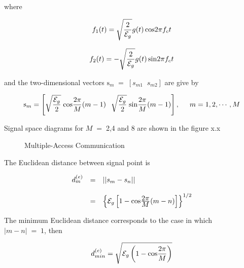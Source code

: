 where

\begin{equation}
f_1(t)=\sqrt{\frac{\hbox{$2$}}{\hbox{$\mathcal{E}_g$}}}g(t)\,\mathrm{cos}2\pi f_c t
\end{equation}

\begin{equation}
f_2(t)=-\sqrt{\frac{\hbox{$2$}}{\hbox{$\mathcal{E}_g$}}}g(t)\,\mathrm{sin}2\pi f_c t
\end{equation}

and the two-dimensional vectors $\mathrm{s}_m\;=\;[s_{m1}\;\;s_{m2}]$ are give by

\begin{equation}
\mathrm{s}_m=\left [
\sqrt{\frac{\hbox{$\mathcal{E}_g$}}{\hbox{$2$}}}\;\mathrm{cos}
\frac{\hbox{$2\pi$}}{\hbox{$M$}}(m-1)\hspace{2.5mm}
\sqrt{\frac{\hbox{$\mathcal{E}_g$}}{\hbox{$2$}}}\;\mathrm{sin}
\frac{\hbox{$2\pi$}}{\hbox{$M$}}(m-1)
\right ],\hspace{5mm} m=1,2,\cdots,M
\end{equation}

Signal space diagrams for $M\;=\;$2,4 and 8 are shown in the figure x.x \\

\begin{figure}[htb]
\centerline{  }
\caption{Multiple-Access Communication}
\end{figure}

The Euclidean distance between signal point is 

\begin{eqnarray}
\begin{array}{lll}
d_m^{(e)}&=&\vert \vert s_m - s_n \vert \vert \\ \\
&=&\left \{\mathcal{E}_g\left [1-\mathrm{cos}\frac{\hbox{$2\pi$}}{\hbox{$M$}}(m-n)\right ] \right \}^{1/2}
\end{array}
\end{eqnarray}

The minimum Euclidean distance corresponds to the case in which \\$\vert m-n\vert \;=\;1$, then

\begin{equation}
d_{min}^{(e)}=\sqrt{\mathcal{E}_g\left(1-\mathrm{cos}\frac{\hbox{$2\pi$}}{\hbox{$M$}}\right )}
\end{equation}

